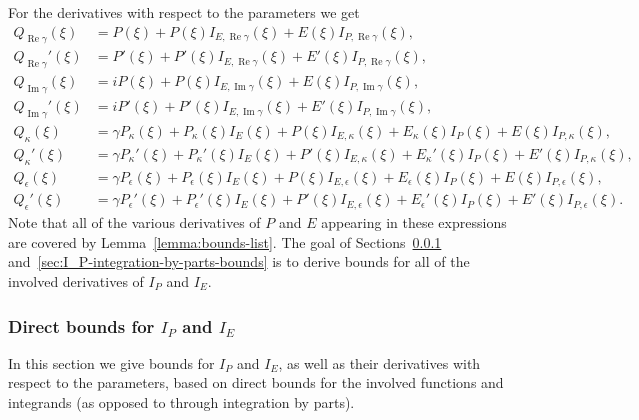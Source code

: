 \documentclass[11pt]{article}
\DeclareMathOperator{\real}{Re}
\DeclareMathOperator{\imag}{Im}
\begin{document}
For the derivatives with respect to the parameters we get
\begin{align*}
  Q_{\real\gamma}(\xi)
  &= P(\xi)
    + P(\xi)I_{E,\real\gamma}(\xi)
    + E(\xi)I_{P,\real\gamma}(\xi),\\
  Q_{\real\gamma}'(\xi)
  &= P'(\xi)
    + P'(\xi)I_{E,\real\gamma}(\xi)
    + E'(\xi)I_{P,\real\gamma}(\xi),\\
  Q_{\imag\gamma}(\xi)
  &= iP(\xi)
    + P(\xi)I_{E,\imag\gamma}(\xi)
    + E(\xi)I_{P,\imag\gamma}(\xi),\\
  Q_{\imag\gamma}'(\xi)
  &= iP'(\xi)
    + P'(\xi)I_{E,\imag\gamma}(\xi)
    + E'(\xi)I_{P,\imag\gamma}(\xi),\\
  Q_{\kappa}(\xi)
  &= \gamma P_{\kappa}(\xi)
    + P_{\kappa}(\xi)I_{E}(\xi)
    + P(\xi)I_{E,\kappa}(\xi)
    + E_{\kappa}(\xi)I_{P}(\xi)
    + E(\xi)I_{P,\kappa}(\xi),\\
  Q_{\kappa}'(\xi)
  &= \gamma P_{\kappa}'(\xi)
    + P_{\kappa}'(\xi)I_{E}(\xi)
    + P'(\xi)I_{E,\kappa}(\xi)
    + E_{\kappa}'(\xi)I_{P}(\xi)
    + E'(\xi)I_{P,\kappa}(\xi),\\
  Q_{\epsilon}(\xi)
  &= \gamma P_{\epsilon}(\xi)
    + P_{\epsilon}(\xi)I_{E}(\xi)
    + P(\xi)I_{E,\epsilon}(\xi)
    + E_{\epsilon}(\xi)I_{P}(\xi)
    + E(\xi)I_{P,\epsilon}(\xi),\\
  Q_{\epsilon}'(\xi)
  &= \gamma P_{\epsilon}'(\xi)
    + P_{\epsilon}'(\xi)I_{E}(\xi)
    + P'(\xi)I_{E,\epsilon}(\xi)
    + E_{\epsilon}'(\xi)I_{P}(\xi)
    + E'(\xi)I_{P,\epsilon}(\xi).
\end{align*}
Note that all of the various derivatives of \(P\) and \(E\) appearing
in these expressions are covered by Lemma~\ref{lemma:bounds-list}. The
goal of Sections~\ref{sec:I_P-I_E-direct-bounds}
and~\ref{sec:I_P-integration-by-parts-bounds} is to derive bounds for
all of the involved derivatives of \(I_{P}\) and \(I_{E}\).

\subsubsection{Direct bounds for \(I_{P}\) and \(I_{E}\)}
\label{sec:I_P-I_E-direct-bounds}
In this section we give bounds for \(I_{P}\) and \(I_{E}\), as well as
their derivatives with respect to the parameters, based on direct
bounds for the involved functions and integrands (as opposed to
through integration by parts).
\end{document}
